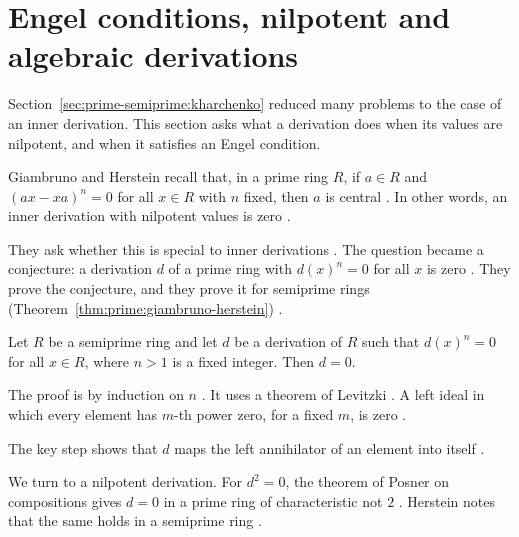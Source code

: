 \section{Engel conditions, nilpotent and algebraic derivations}\label{sec:prime-semiprime:engel-nilpotent}

Section~\ref{sec:prime-semiprime:kharchenko} reduced many problems to the case of
an inner derivation. This section asks what a derivation does when its values are
nilpotent, and when it satisfies an Engel condition.

Giambruno and Herstein recall that, in a prime ring
$R$, if $a\in R$ and $(ax-xa)^n=0$ for all $x\in R$ with $n$ fixed, then $a$ is
central \cite[p.~199]{GiambrunoHerstein1981}. In other words, an inner derivation
with nilpotent values is zero \cite[p.~199]{GiambrunoHerstein1981}.

They ask whether this is special to inner derivations
\cite[p.~199]{GiambrunoHerstein1981}. The question became a conjecture: a
derivation $d$ of a prime ring with $d(x)^n=0$ for all $x$ is zero
\cite[p.~199]{GiambrunoHerstein1981}. They prove the conjecture, and they prove
it for semiprime rings (Theorem~\ref{thm:prime:giambruno-herstein}) \cite[p.~199]{GiambrunoHerstein1981}.

\begin{theorem}\label{thm:prime:giambruno-herstein}
Let $R$ be a semiprime ring and let $d$ be a derivation of $R$ such that
$d(x)^n=0$ for all $x\in R$, where $n>1$ is a fixed integer. Then $d=0$.
\end{theorem}

The proof is by induction on $n$ \cite[p.~200]{GiambrunoHerstein1981}. It uses a theorem of Levitzki \cite[p.~200]{GiambrunoHerstein1981}. A left ideal in which every element has $m$-th power zero,
for a fixed $m$, is zero \cite[Remark~4, p.~200]{GiambrunoHerstein1981}.

The key step shows that $d$ maps the left annihilator of an element into itself
\cite[Lemma~1, p.~200]{GiambrunoHerstein1981}.

We turn to a nilpotent derivation. For $d^2=0$, the theorem of Posner on
compositions gives $d=0$ in a prime ring of characteristic not $2$
\cite[p.~179]{MartindaleMiers1983}. Herstein notes that the same holds in a
semiprime ring \cite[p.~509]{Herstein1979}.

